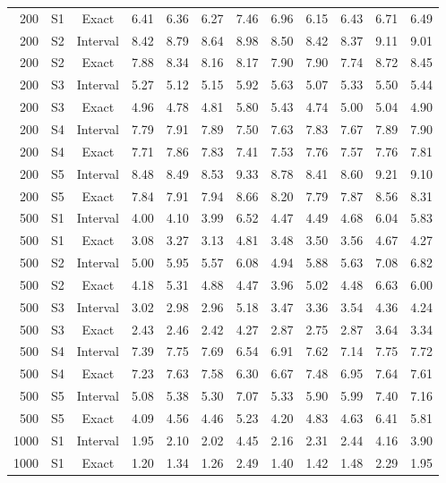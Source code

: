 \documentclass[12pt]{article}
\theoremstyle{definition}
\theoremstyle{remark}
\begin{document}
\begin{longtable}{rccrrrrrrrrr}
200 & S1 & Exact & 6.41 & 6.36 & 6.27 & 7.46 & 6.96 & 6.15 & 6.43 & 6.71 & 6.49 \\
200 & S2 & Interval & 8.42 & 8.79 & 8.64 & 8.98 & 8.50 & 8.42 & 8.37 & 9.11 & 9.01 \\
200 & S2 & Exact & 7.88 & 8.34 & 8.16 & 8.17 & 7.90 & 7.90 & 7.74 & 8.72 & 8.45 \\
200 & S3 & Interval & 5.27 & 5.12 & 5.15 & 5.92 & 5.63 & 5.07 & 5.33 & 5.50 & 5.44 \\
200 & S3 & Exact & 4.96 & 4.78 & 4.81 & 5.80 & 5.43 & 4.74 & 5.00 & 5.04 & 4.90 \\
200 & S4 & Interval & 7.79 & 7.91 & 7.89 & 7.50 & 7.63 & 7.83 & 7.67 & 7.89 & 7.90 \\
200 & S4 & Exact & 7.71 & 7.86 & 7.83 & 7.41 & 7.53 & 7.76 & 7.57 & 7.76 & 7.81 \\
200 & S5 & Interval & 8.48 & 8.49 & 8.53 & 9.33 & 8.78 & 8.41 & 8.60 & 9.21 & 9.10 \\
200 & S5 & Exact & 7.84 & 7.91 & 7.94 & 8.66 & 8.20 & 7.79 & 7.87 & 8.56 & 8.31 \\
500 & S1 & Interval & 4.00 & 4.10 & 3.99 & 6.52 & 4.47 & 4.49 & 4.68 & 6.04 & 5.83 \\
500 & S1 & Exact & 3.08 & 3.27 & 3.13 & 4.81 & 3.48 & 3.50 & 3.56 & 4.67 & 4.27 \\
500 & S2 & Interval & 5.00 & 5.95 & 5.57 & 6.08 & 4.94 & 5.88 & 5.63 & 7.08 & 6.82 \\
500 & S2 & Exact & 4.18 & 5.31 & 4.88 & 4.47 & 3.96 & 5.02 & 4.48 & 6.63 & 6.00 \\
500 & S3 & Interval & 3.02 & 2.98 & 2.96 & 5.18 & 3.47 & 3.36 & 3.54 & 4.36 & 4.24 \\
500 & S3 & Exact & 2.43 & 2.46 & 2.42 & 4.27 & 2.87 & 2.75 & 2.87 & 3.64 & 3.34 \\
500 & S4 & Interval & 7.39 & 7.75 & 7.69 & 6.54 & 6.91 & 7.62 & 7.14 & 7.75 & 7.72 \\
500 & S4 & Exact & 7.23 & 7.63 & 7.58 & 6.30 & 6.67 & 7.48 & 6.95 & 7.64 & 7.61 \\
500 & S5 & Interval & 5.08 & 5.38 & 5.30 & 7.07 & 5.33 & 5.90 & 5.99 & 7.40 & 7.16 \\
500 & S5 & Exact & 4.09 & 4.56 & 4.46 & 5.23 & 4.20 & 4.83 & 4.63 & 6.41 & 5.81 \\
1000 & S1 & Interval & 1.95 & 2.10 & 2.02 & 4.45 & 2.16 & 2.31 & 2.44 & 4.16 & 3.90 \\
1000 & S1 & Exact & 1.20 & 1.34 & 1.26 & 2.49 & 1.40 & 1.42 & 1.48 & 2.29 & 1.95 \\

\end{longtable}
\end{document}
